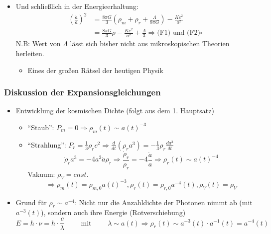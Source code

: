 \begin{itemize}
	\item Und schließlich in der Energieerhaltung:
		\begin{align*}
			\left(\frac{\dot{a}}{a}\right)^2&=\frac{8\pi G}{3}\left(\rho_m+\rho_r+\frac{\Lambda}{8\pi G}\right)-\frac{Kc^2}{a^2}\\
			&=\frac{8\pi G}{3}\rho-\frac{Kc^2}{a^2}+\frac{\Lambda}{3} \Rightarrow \text{(F1) und (F2)} \square
		\end{align*}
		N.B: Wert von $\Lambda$ lässt sich bisher nicht aus mikroskopischen Theorien herleiten.
		\begin{itemize}
			\item Eines der großen Rätsel der heutigen Physik
		\end{itemize}
\end{itemize}
\subsubsection{Diskussion der Expansionsgleichungen}
\begin{itemize}
	\item Entwicklung der kosmischen Dichte (folgt aus dem 1. Hauptsatz)
		\begin{itemize}[label={$\cdot$}]
			\item "`Staub"': $P_m=0\Rightarrow \rho_m(t)\sim a(t)^{-3}$
			\item "`Strahlung"': $P_r=\frac{1}{3}\rho_rc^2\Rightarrow \frac{d}{dt}\left(\rho_ra^3\right)=-\frac{1}{3}\rho_r\frac{da^3}{dt}$
				\begin{equation*}
					\dot{\rho}_ra^3=-4a^2\dot{a}\rho_r \Rightarrow \frac{\dot{\rho}_r}{\rho_r}=-4\frac{\dot{a}}{a}\Rightarrow \rho_r(t)\sim a(t)^{-4}
				\end{equation*}
				Vakuum: $\rho_V=cnst.$\\
				\begin{equation*}
					\Rightarrow \rho_m(t)=\rho_{m,0}a(t)^{-3},\rho_r(t)=\rho_{r,0}a^{-4}(t),\rho_V(t)=\rho_V
				\end{equation*}
		\end{itemize}
	\item Grund für $\rho_r\sim a^{-4}$: Nicht nur die Anzahldichte der Photonen nimmt ab (mit $a^{-3}(t)$), sondern auch ihre Energie (Rotverschiebung)
		\begin{equation*}
			E=h\cdot\nu = h\cdot\frac{c}{\lambda}\qquad\text{ mit }\qquad\lambda\sim a(t)\Rightarrow \rho_r(t)\sim a^{-3}(t)\cdot a^{-1}(t)=a^{-4}(t)
		\end{equation*}
\end{itemize}
